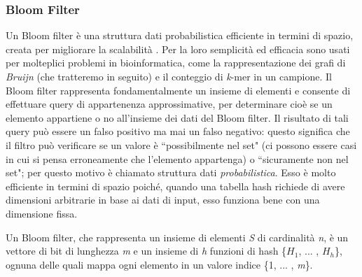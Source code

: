 \documentclass[../main.tex]{subfiles}
\begin{document}
\subsubsection{Bloom Filter}
\label{BloomFilter}
Un Bloom filter è una struttura dati probabilistica efficiente in termini di spazio, creata per migliorare la scalabilità \cite{sun-medvedev2018vargeno}. Per la loro semplicità ed efficacia sono usati per molteplici problemi in bioinformatica, come la rappresentazione dei grafi di \textit{Bruijn} (che tratteremo in seguito) e il conteggio di \textit{k}-mer in un campione. Il Bloom filter rappresenta fondamentalmente un insieme di elementi e consente di effettuare query di appartenenza approssimative, per determinare cioè se un elemento appartiene o no all'insieme dei dati del Bloom filter. Il risultato di tali query può essere un falso positivo ma mai un falso negativo: questo significa che il filtro può verificare se un valore è ``possibilmente nel set" (ci possono essere casi in cui si pensa erroneamente che l'elemento appartenga) o ``sicuramente non nel set"; per questo motivo è chiamato struttura dati \textit{probabilistica}. Esso è molto efficiente in termini di spazio poiché, quando una tabella hash richiede di avere dimensioni arbitrarie in base ai dati di input, esso funziona bene con una dimensione fissa.


\theoremstyle{definition}
\begin{definition} 

Un Bloom filter, che rappresenta un insieme di elementi \textit{S} di cardinalità \textit{n}, è un vettore di bit di lunghezza \textit{m} e un insieme di \textit{h} funzioni di hash \{$H_{1}$, ... , $H_{h}$\}, ognuna delle quali mappa ogni elemento in un valore indice \{1, ... , \textit{m}\}. 

\end{definition}
\end{document}
